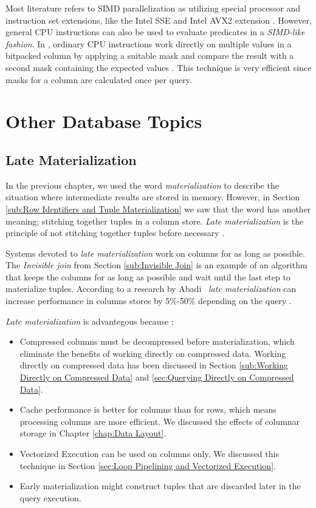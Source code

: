 Most literature refers to SIMD parallelization as utilizing special processor and instruction set extensions, like the Intel SSE and Intel AVX2 extension \cite{Willhalm2013-ri, Willhalm2009-hu}. However, general CPU instructions can also be used to evaluate predicates in a \textit{SIMD-like fashion}. In \blink, ordinary CPU instructions work directly on multiple values in a bitpacked column by applying a suitable mask and compare the result with a second mask containing the expected values \cite{Johnson2008-cp}. This technique is very efficient since masks for a column are calculated once per query.



\section{Other Database Topics}
\label{sec:Other Database Topics}

\subsection{Late Materialization}
\label{sub:Late Materialization}
In the previous chapter, we used the word \textit{materialization} to describe the situation where intermediate results are stored in memory. However, in Section \ref{sub:Row Identifiers and Tuple Materialization} we saw that the word has another meaning; stitching together tuples in a column store. \textit{Late materialization} is the principle of not stitching together tuples before necessary \cite{Abadi2008-dd}.

Systems devoted to \textit{late materialization} work on columns for as long as possible. The \textit{Invisible join} from Section \ref{sub:Invisible Join} is an example of an algorithm that keeps the columns for as long as possible and wait until the last step to materialize tuples. According to a research by Abadi \ea~\textit{late materialization} can increase performance in columns stores by 5\%-50\% depending on the query \cite{Abadi2008-dd}.

\textit{Late materialization} is advantegous because \cite{Abadi2008-dd}:
\begin{itemize}
  \item Compressed columns must be decompressed before materialization, which eliminate the benefits of working directly on compressed data. Working directly on compressed data has been discussed in Section \ref{sub:Working Directly on Compressed Data} and \ref{sec:Querying Directly on Compressed Data}.
  \item Cache performance is better for columns than for rows, which means processing columns are more efficient. We discussed the effects of columnar storage in Chapter \ref{chap:Data Layout}.
  \item Vectorized Execution can be used on columns only. We discussed this technique in Section \ref{sec:Loop Pipelining and Vectorized Execution}.
  \item Early materialization might construct tuples that are discarded later in the query execution.
\end{itemize}


